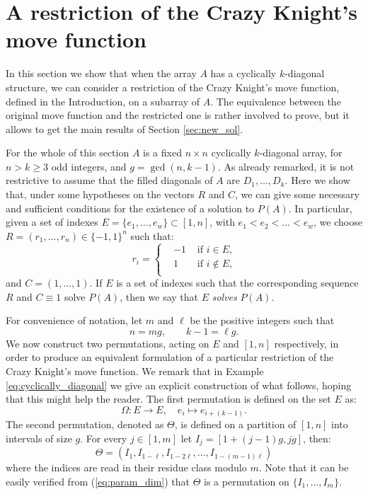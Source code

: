 \documentclass{amsart}
\theoremstyle{definition}
\numberwithin{equation}{section}
\begin{document}
\section{A restriction of the Crazy Knight's move function} \label{sec:equivalenza}
In this section we show that when the array $A$ has a cyclically $k$-diagonal structure, we can consider a restriction of the Crazy Knight's move function, defined in the Introduction, on a subarray of $A$. The equivalence between the original move function and the restricted one is rather involved to prove, but it allows to get the main results of Section \ref{sec:new_sol}.

For the whole of this section $A$ is a fixed $n \times n$ cyclically $k$-diagonal array, for $n>k\geq 3$ odd integers, and $g=\gcd(n,k-1)$. As already remarked, it is not restrictive to assume that the filled diagonals of $A$ are $D_1,\ldots,D_k$. Here we show that, under some hypotheses on the vectors $R$ and $C$, we can give some necessary and sufficient conditions for the existence of a solution to $P(A)$. In particular, given a set of indexes $E=\{e_1,\dotsc,e_w\}\subset[1,n]$, with $e_1<e_2<\dotsc<e_w$,
we choose $R = (r_1,\dotsc, r_n)\in \{-1,1\}^n$ such that:
\[
r_i = \left\{ \begin{aligned}
&-1 &\text{ if $i\in E$,} \\
&1 &\text{ if $i \not \in E$,} \\
\end{aligned}
\right.
\] 
and $C = (1,\dotsc,1)$.
If $E$ is a set of indexes such that the corresponding sequence $R$ and  $C \equiv 1$ solve $P(A)$, then we say that $E$ \textit{solves} $P(A)$.

For convenience of notation, let $m$ and $\ell$ be the positive integers such that
\begin{equation} \label{eq:param_dim}
	n = mg, \qquad k-1 = \ell g.
\end{equation}
We now construct two permutations, acting on $E$ and $[1,n]$ respectively, in order to produce an equivalent formulation of a particular restriction of the Crazy Knight's move function. We remark that in Example \ref{eq:cyclically_diagonal} we give an explicit construction of what follows, hoping that this might help the reader. The first permutation is defined on the set $E$ as:
\[
\Omega: E \rightarrow E, \quad e_i \mapsto e_{i+(k-1)}.
\]
The second permutation, denoted as $\Theta$, is defined on a partition of $[1,n]$ into intervals of size $g$. For every $j \in [1,m]$ let  $I_j = [1+(j-1)g,jg] $, then:
\begin{equation}  \label{eq:procedureTheta}
\Theta = (I_{1},I_{1-\ell},I_{1-2\ell},\dotsc,I_{1-(m-1)\ell})
\end{equation} 
where the indices are read in their residue class modulo $m$. Note that it can be easily verified from (\ref{eq:param_dim}) that $\Theta$ is a permutation on $\{I_1,\dotsc, I_m\}$.
\end{document}
